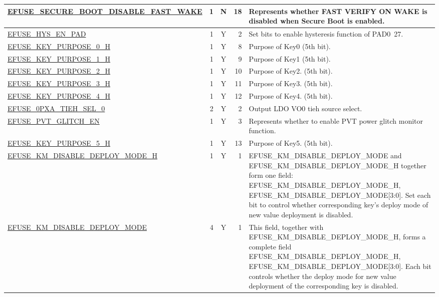 \begin{longtable}[l]{ |m{8.2cm}|r|c|r|m{9cm}| }
    \hyperref[fielddesc:EFUSESECUREBOOTDISABLEFASTWAKE]{EFUSE\_SECURE\_BOOT\_DISABLE\_FAST\_WAKE} & 1 & N & 18 & Represents whether FAST VERIFY ON WAKE is disabled when Secure Boot is enabled. \\ \hline
    \hyperref[fielddesc:EFUSEHYSENPAD]{EFUSE\_HYS\_EN\_PAD} & 1 & Y & 2 & Set bits to enable hysteresis function of PAD0~27. \\ \hline
    \hyperref[fielddesc:EFUSEKEYPURPOSE0H]{EFUSE\_KEY\_PURPOSE\_0\_H} & 1 & Y & 8 & Purpose of Key0 (5th bit). \\ \hline
    \hyperref[fielddesc:EFUSEKEYPURPOSE1H]{EFUSE\_KEY\_PURPOSE\_1\_H} & 1 & Y & 9 & Purpose of Key1 (5th bit). \\ \hline
    \hyperref[fielddesc:EFUSEKEYPURPOSE2H]{EFUSE\_KEY\_PURPOSE\_2\_H} & 1 & Y & 10 & Purpose of Key2. (5th bit). \\ \hline
    \hyperref[fielddesc:EFUSEKEYPURPOSE3H]{EFUSE\_KEY\_PURPOSE\_3\_H} & 1 & Y & 11 & Purpose of Key3. (5th bit). \\ \hline
    \hyperref[fielddesc:EFUSEKEYPURPOSE4H]{EFUSE\_KEY\_PURPOSE\_4\_H} & 1 & Y & 12 & Purpose of Key4. (5th bit). \\ \hline
    \hyperref[fielddesc:EFUSE0PXATIEHSEL0]{EFUSE\_0PXA\_TIEH\_SEL\_0} & 2 & Y & 2 & Output LDO VO0 tieh source select. \\ \hline
    \hyperref[fielddesc:EFUSEPVTGLITCHEN]{EFUSE\_PVT\_GLITCH\_EN} & 1 & Y & 3 & Represents whether to enable PVT power glitch monitor function. \\ \hline
    \hyperref[fielddesc:EFUSEKEYPURPOSE5H]{EFUSE\_KEY\_PURPOSE\_5\_H} & 1 & Y & 13 & Purpose of Key5. (5th bit). \\ \hline
    \hyperref[fielddesc:EFUSEKMDISABLEDEPLOYMODEH]{EFUSE\_KM\_DISABLE\_DEPLOY\_MODE\_H} & 1 & Y & 1 & EFUSE\_KM\_DISABLE\_DEPLOY\_MODE and EFUSE\_KM\_DISABLE\_DEPLOY\_MODE\_H together form one field: {EFUSE\_KM\_DISABLE\_DEPLOY\_MODE\_H, EFUSE\_KM\_DISABLE\_DEPLOY\_MODE[3:0]}. Set each bit to control whether corresponding key's deploy mode of new value deployment is disabled. \\ \hline
    \hyperref[fielddesc:EFUSEKMDISABLEDEPLOYMODE]{EFUSE\_KM\_DISABLE\_DEPLOY\_MODE} & 4 & Y & 1 & This field, together with EFUSE\_\-KM\_\-DISABLE\_\-DEPLOY\_\-MODE\_\-H, forms a complete field {EFUSE\_\-KM\_\-DISABLE\_\-DEPLOY\_\-MODE\_\-H, EFUSE\_\-KM\_\-DISABLE\_\-DEPLOY\_\-MODE[3:0]}. Each bit controls whether the deploy mode for new value deployment of the corresponding key is disabled. \\ \hline

\end{longtable}
